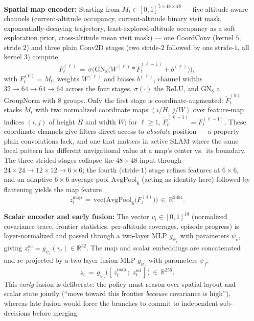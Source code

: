 \documentclass[conference]{IEEEtran}
\begin{document}
\textbf{Spatial map encoder:} Starting from $M_t\!\in\![0,1]^{5{\times}48{\times}48}$ --- five altitude-aware channels (current-altitude occupancy, current-altitude binary visit mask, exponentially-decaying trajectory, least-explored-altitude occupancy as a soft exploration prior, cross-altitude mean visit mask) --- one CoordConv (kernel $5$, stride $2$) and three plain Conv2D stages (two stride-$2$ followed by one stride-$1$, all kernel $3$) compute
\begin{equation}
F^{(\ell)}_t \,=\, \sigma\big(\mathrm{GN}_8\big(W^{(\ell)}\!*\!\widetilde{F}^{(\ell-1)}_t + b^{(\ell)}\big)\big),
\label{eq:coordconv}
\end{equation}
with $F^{(0)}_t\!=\!M_t$, weights $W^{(\ell)}$ and biases $b^{(\ell)}$, channel widths $32\!\to\!64\!\to\!64\!\to\!64$ across the four stages, $\sigma(\cdot)$ the ReLU, and $\mathrm{GN}_8$ a GroupNorm with $8$ groups. Only the first stage is coordinate-augmented: $\widetilde{F}^{(0)}_t$ stacks $M_t$ with two normalized coordinate maps $(i/H,\,j/W)$ over feature-map indices $(i,j)$ of height $H$ and width $W$; for $\ell\!\geq\!1$, $\widetilde{F}^{(\ell-1)}_t\!=\!F^{(\ell-1)}_t$. These coordinate channels give filters direct access to \emph{absolute} position --- a property plain convolutions lack, and one that matters in active SLAM where the same local pattern has different navigational value at a map's center vs.\ its boundary. The three strided stages collapse the $48{\times}48$ input through $24{\times}24\!\to\!12{\times}12\!\to\!6{\times}6$; the fourth (stride-$1$) stage refines features at $6{\times}6$, and an adaptive $6{\times}6$ average pool $\mathrm{AvgPool}_{6}$ (acting as identity here) followed by flattening yields the map feature
\begin{equation}
z^{\text{map}}_t \,=\, \mathrm{vec}\big(\mathrm{AvgPool}_{6}\big(F^{(4)}_t\big)\big) \,\in\, \mathbb{R}^{2304}.
\label{eq:zmap}
\end{equation}

\textbf{Scalar encoder and early fusion:} The vector $v_t\!\in\![0,1]^{10}$ (normalized covariance trace, frontier statistics, per-altitude coverages, episode progress) is layer-normalized and passed through a two-layer MLP $g_{\psi_v}$ with parameters $\psi_v$, giving $z^{\text{scl}}_t\!=\!g_{\psi_v}(v_t)\!\in\!\mathbb{R}^{32}$. The map and scalar embeddings are concatenated and re-projected by a two-layer fusion MLP $g_{\psi_f}$ with parameters $\psi_f$:
\begin{equation}
z_t \,=\, g_{\psi_f}\big([\,z^{\text{map}}_t\,;\;z^{\text{scl}}_t\,]\big) \,\in\, \mathbb{R}^{256}.
\label{eq:fuse}
\end{equation}
This \emph{early} fusion is deliberate: the policy must reason over spatial layout and scalar state jointly (``move toward this frontier \emph{because} covariance is high''), whereas late fusion would force the branches to commit to independent sub-decisions before merging.
\end{document}
